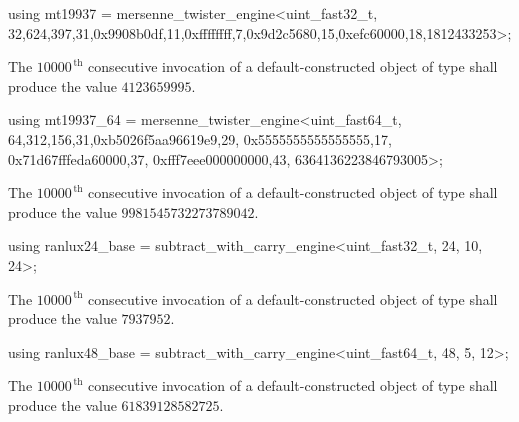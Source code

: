 %
%
\begin{itemdecl}
using mt19937 =
      mersenne_twister_engine<uint_fast32_t,
       32,624,397,31,0x9908b0df,11,0xffffffff,7,0x9d2c5680,15,0xefc60000,18,1812433253>;
\end{itemdecl}

\begin{itemdescr}
\pnum\required
 The $10000^{\,\mathrm{th}}$ consecutive invocation
 of a default-constructed object
 of type 
 shall produce the value $4123659995$.
\end{itemdescr}

%
%
\begin{itemdecl}
using mt19937_64 =
      mersenne_twister_engine<uint_fast64_t,
       64,312,156,31,0xb5026f5aa96619e9,29,
       0x5555555555555555,17,
       0x71d67fffeda60000,37,
       0xfff7eee000000000,43,
       6364136223846793005>;
\end{itemdecl}

\begin{itemdescr}
\pnum\required
 The $10000^{\,\mathrm{th}}$ consecutive invocation
 of a default-constructed object
 of type 
 shall produce the value $9981545732273789042$.
\end{itemdescr}

%
%
\begin{itemdecl}
using ranlux24_base =
      subtract_with_carry_engine<uint_fast32_t, 24, 10, 24>;
\end{itemdecl}

\begin{itemdescr}
\pnum\required
 The $10000^{\,\mathrm{th}}$ consecutive invocation
 of a default-constructed object
 of type 
 shall produce the value
 $ 7937952 $.
\end{itemdescr}

%
%
\begin{itemdecl}
using ranlux48_base =
      subtract_with_carry_engine<uint_fast64_t, 48, 5, 12>;
\end{itemdecl}

\begin{itemdescr}
\pnum\required
 The $10000^{\,\mathrm{th}}$ consecutive invocation
 of a default-constructed object
 of type 
 shall produce the value
 $ 61839128582725 $.
\end{itemdescr}

